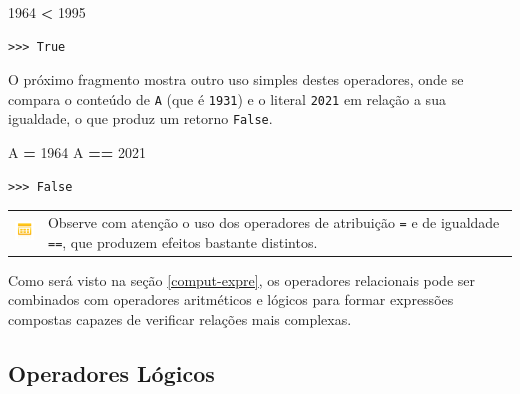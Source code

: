 \documentclass[
]{book}
\newenvironment{Shaded}{\begin{snugshade}}{\end{snugshade}}
\newcommand{\DecValTok}[1]{\textcolor[rgb]{0.00,0.00,0.81}{#1}}
\newcommand{\NormalTok}[1]{#1}
\newcommand{\OperatorTok}[1]{\textcolor[rgb]{0.81,0.36,0.00}{\textbf{#1}}}
\begin{document}
\begin{Shaded}
\begin{Highlighting}[]
\DecValTok{1964} \OperatorTok{\textless{}} \DecValTok{1995}
\end{Highlighting}
\end{Shaded}

\begin{verbatim}
>>> True
\end{verbatim}

O próximo fragmento mostra outro uso simples destes operadores, onde se compara o conteúdo de \texttt{A} (que é \texttt{1931}) e o literal \texttt{2021} em relação a sua igualdade, o que produz um retorno \texttt{False}.

\begin{Shaded}
\begin{Highlighting}[]
\NormalTok{A }\OperatorTok{=} \DecValTok{1964}
\NormalTok{A }\OperatorTok{==} \DecValTok{2021}
\end{Highlighting}
\end{Shaded}

\begin{verbatim}
>>> False
\end{verbatim}

\begin{longtable}[]{@{}
  >{\centering\arraybackslash}p{}
  >{\raggedright\arraybackslash}p{}@{}}
\toprule
& \\
\midrule
\endhead
\includegraphics{images/application-yellow.png} & Observe com atenção o uso dos operadores de atribuição \texttt{=} e de igualdade \texttt{==}, que produzem efeitos bastante distintos. \\
\bottomrule
\end{longtable}

Como será visto na seção \ref{comput-expre}, os operadores relacionais pode ser combinados com operadores aritméticos e lógicos para formar expressões compostas capazes de verificar relações mais complexas.

\hypertarget{comput-opera-logic}{%
\subsection{Operadores Lógicos}\label{comput-opera-logic}}
\end{document}

